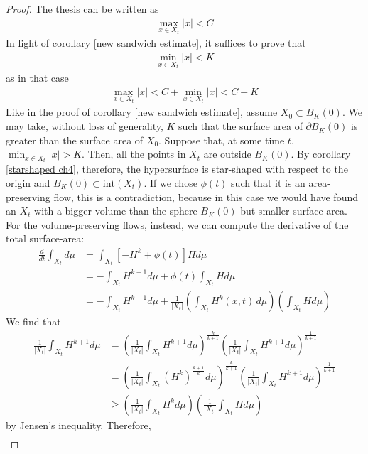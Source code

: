 \begin{proof}
	The thesis can be written as 
	\begin{align*}
		\max_{x\in X_t} |x| < C
	\end{align*}
	In light of corollary \ref{new sandwich estimate}, it suffices to prove that 
	\begin{align*}
		\min_{x\in X_t} |x| < K
	\end{align*}
	as in that case 
	\begin{align*}
		\max_{x\in X_t} |x| < C + \min_{x\in X_t} |x| < C+K
	\end{align*}
	Like in the proof of corollary \ref{new sandwich estimate}, assume $X_0\subset B_K(0)$. We may take, without loss of generality, $K$ such that the surface area of $\partial B_K(0)$ is greater than the surface area of $X_0$. 
	Suppose that, at some time $t$, $\min_{x\in X_t} |x| > K$. Then, all the points in $X_t$ are outside $B_K(0)$.  By corollary \ref{starshaped ch4}, therefore, the hypersurface is star-shaped with respect to the origin and $B_K(0)\subset \mathrm{int}(X_t)$. If we chose $\phi(t)$ such that it is an area-preserving flow, this is a contradiction, because in this case we would have found an $X_t$ with a bigger volume than the sphere $B_K(0)$ but smaller surface area. For the volume-preserving flows, instead, we can compute the derivative of the total surface-area: 
	\begin{align*}
		\frac{d}{d t}\int_{X_t} d\mu &=  \int_{X_t}  \left[- H^k + \phi(t)\right] H d\mu \\
		&= - \int_{X_t}  H^{k+1} d\mu  + \phi(t)\int_{X_t} H d\mu\\
		&= - \int_{X_t}  H^{k+1} d\mu  + \frac{1}{|X_t|}\left(\int_{X_t} H^k(x, t) \, d\mu\right)\left(\int_{X_t} H d\mu\right)
	\end{align*}
	We find that 
	\begin{align*}
		\frac{1}{|X_t|}\int_{X_t}  H^{k+1} d\mu &=\left(\frac{1}{|X_t|}\int_{X_t}  H^{k+1} d\mu\right)^{\frac{k}{k+1}}\left(\frac{1}{|X_t|}\int_{X_t}  H^{k+1} d\mu\right)^{\frac{1}{k+1}}\\ &=\left(\frac{1}{|X_t|}\int_{X_t}  \left(H^{k}\right)^{\frac{k+1}{k}} d\mu\right)^{\frac{k}{k+1}}  \left(\frac{1}{|X_t|}\int_{X_t}  H^{k+1} d\mu\right)^{\frac{1}{k+1}}\\
		&\geq \left(\frac{1}{|X_t|}\int_{X_t}  H^{k} d\mu\right) \left(\frac{1}{|X_t|}\int_{X_t}  H d\mu\right)
	\end{align*}
	by Jensen's inequality. Therefore, 
	\begin{align*}

\end{align*}
\end{proof}
